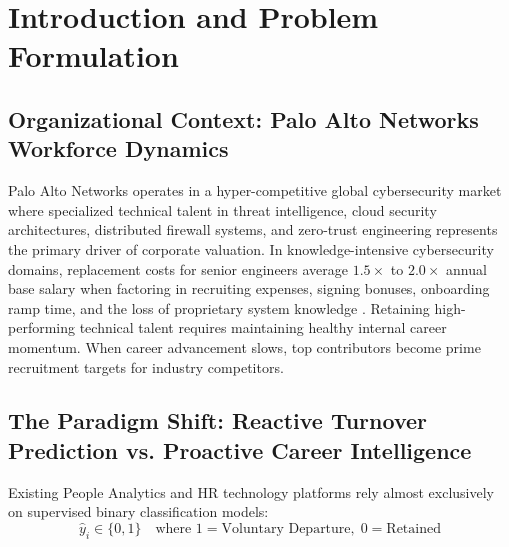 \documentclass[12pt,a4paper,oneside]{article}
\begin{document}
\vspace{0.06in}

\section{Introduction and Problem Formulation}

\subsection{Organizational Context: Palo Alto Networks Workforce Dynamics}
Palo Alto Networks operates in a hyper-competitive global cybersecurity market where specialized technical talent in threat intelligence, cloud security architectures, distributed firewall systems, and zero-trust engineering represents the primary driver of corporate valuation. In knowledge-intensive cybersecurity domains, replacement costs for senior engineers average $1.5\times$ to $2.0\times$ annual base salary when factoring in recruiting expenses, signing bonuses, onboarding ramp time, and the loss of proprietary system knowledge \cite{ref_cascio_turnover}. Retaining high-performing technical talent requires maintaining healthy internal career momentum. When career advancement slows, top contributors become prime recruitment targets for industry competitors.

\subsection{The Paradigm Shift: Reactive Turnover Prediction vs. Proactive Career Intelligence}
Existing People Analytics and HR technology platforms rely almost exclusively on supervised binary classification models:
$$\hat{y}_i \in \{0, 1\} \quad \text{where } 1 = \text{Voluntary Departure}, \; 0 = \text{Retained}$$
\end{document}
